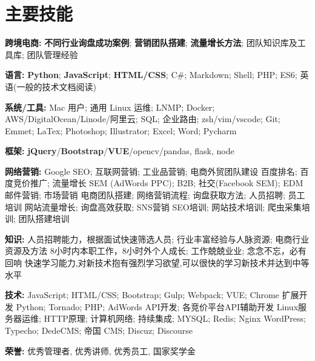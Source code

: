 \section{\textbf{主要技能}}
\resumeSubHeadingListStart
\item{
  \textbf{跨境电商:}{ \textbf{不同行业询盘成功案例}; \textbf{营销团队搭建}; \textbf{流量增长方法}; 团队知识库及工具库; 团队管理经验}
}
\item{
  \textbf{语言:}{ \textbf{Python}; \textbf{JavaScript}; \textbf{HTML/CSS}; C\#; Markdown; Shell; PHP; ES6; 英语(一般的技术文档阅读)}
}
\item{
 \textbf{系统/工具:}{ Mac 用户; 通用 Linux 运维; LNMP; Docker; AWS/DigitalOcean/Linode/阿里云; SQL; 企业路由; zsh/vim/vscode; Git; Emmet; LaTex; Photoshop; Illustrator; Excel; Word; Pycharm}
}
\item{
 \textbf{框架:}{ \textbf{jQuery}/\textbf{Bootstrap}/\textbf{VUE}/opencv/pandas, flask, node}
}
\item{
  \textbf{网络营销:}{
    \resumeItemListStart
       {Google SEO; 互联网营销; 工业品营销; 电商外贸团队建设 }
       {百度排名; 百度竞价推广; 流量增长}
       {SEM (AdWords PPC); B2B; 社交(Facebook SEM); EDM邮件营销; 市场营销 }
       {电商团队搭建; 网络营销流程; 询盘获取方法; 人员招聘; 员工培训 }
       {网站流量增长; 询盘高效获取; SNS营销}
       {SEO培训; 网站技术培训; 爬虫采集培训; 团队搭建培训}
   \resumeItemListEnd
  }
}
\item{
  \textbf{知识:}{
    \resumeItemListStart
       {人员招聘能力，根据面试快速筛选人员; 行业丰富经验与人脉资源; 电商行业资源及方法}
       {8小时内本职工作，8小时外个人成长; 工作兢兢业业; 念念不忘，必有回响}
       {快速学习能力,对新技术抱有强烈学习欲望,可以很快的学习新技术并达到中等水平}
   \resumeItemListEnd
  }
}
\item{
  \textbf{技术:}{
    \resumeItemListStart
       {JavaScript; HTML/CSS; Bootstrap; Gulp; Webpack; VUE; Chrome 扩展开发}
       {Python; Tornado; PHP; AdWords API开发; 各竞价平台API辅助开发}
       {Linux服务器运维; HTTP原理; 计算机网络; 持续集成; MYSQL; Redis; Nginx}
       {WordPress; Typecho; DedeCMS; 帝国 CMS; Discuz; Discourse }
   \resumeItemListEnd
  }
}
\item{
 \textbf{荣誉:}{
  优秀管理者, 优秀讲师, 优秀员工, 国家奖学金
 }
}
\resumeSubHeadingListEnd
